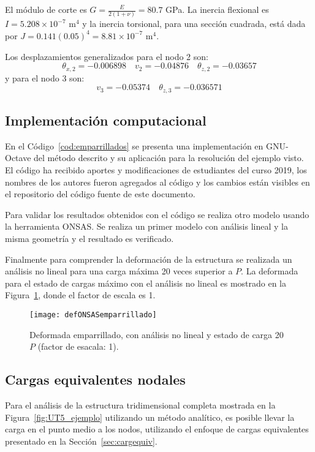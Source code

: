 El módulo de corte es $G=\frac{E}{2(1+\nu)} = 80.7 $ GPa. La inercia flexional es $I= 5.208 \times 10^{-7}$ m$^4$ y la inercia torsional, para una sección cuadrada, está dada por $J= 0.141 (0.05)^4 = 8.81 \times 10^{-7}$ m$^4$.

Los desplazamientos generalizados para el nodo 2 son:
%
$$
\theta_{x,2} = -0.006898
\quad 
v_2 = -0.04876
\quad
\theta_{z,2} = -0.03657
$$
%
y para el nodo 3 son:
$$
v_3 = -0.05374
\quad
\theta_{z,3} = 
-0.036571
$$


\subsection{Implementación computacional}

En el Código~\ref{cod:emparrillados} se presenta una implementación en GNU-Octave del método descrito y su aplicación para la resolución del ejemplo visto. %
%
El código ha recibido aportes y modificaciones de estudiantes del curso 2019, los nombres de los autores fueron agregados al código y los cambios están visibles en el repositorio del código fuente de este documento.



Para validar los resultados obtenidos con el código se realiza otro modelo usando la herramienta ONSAS. Se realiza un primer modelo con análisis lineal y la misma geometría y el resultado es verificado.

Finalmente para comprender la deformación de la estructura se realizada un análisis no lineal para una carga máxima 20 veces superior a $P$. La deformada para el estado de cargas máximo con el análisis no lineal es mostrado en la Figura~\ref{fig:empa}, donde el factor de escala es 1.

\begin{figure}[htb]
	\centering
	\texttt{[image: defONSASemparrillado]}
	\caption{Deformada emparrillado, con análisis no lineal y estado de carga 20 $P$ (factor de esacala: 1).}
	\label{fig:empa}
\end{figure}


\subsection{Cargas equivalentes nodales}

Para el análisis de la estructura tridimensional completa mostrada en la Figura~\ref{fig:UT5_ejemplo} utilizando un método analítico, es posible llevar la carga en el punto medio a los nodos, utilizando el enfoque de cargas equivalentes presentado en la Sección~\ref{sec:cargequiv}.





